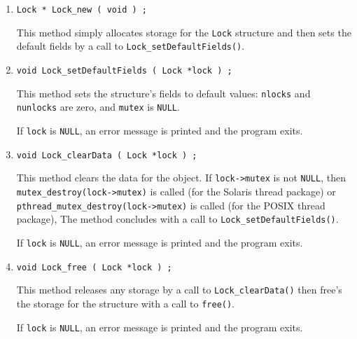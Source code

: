 \begin{enumerate}
\item
\begin{verbatim}
Lock * Lock_new ( void ) ;
\end{verbatim}
This method simply allocates storage for the {\tt Lock} structure 
and then sets the default fields by a call to 
{\tt Lock\_setDefaultFields()}.
\item
\begin{verbatim}
void Lock_setDefaultFields ( Lock *lock ) ;
\end{verbatim}
This method sets the structure's fields to default values:
{\tt nlocks} and {\tt nunlocks} are zero, and {\tt mutex} is {\tt NULL}.
\par {}
If {\tt lock} is {\tt NULL},
an error message is printed and the program exits.
\item
\begin{verbatim}
void Lock_clearData ( Lock *lock ) ;
\end{verbatim}
This method clears the data for the object.
If {\tt lock->mutex} is not {\tt NULL}, 
then {\tt mutex\_destroy(lock->mutex)} is called 
(for the Solaris thread package)
or {\tt pthread\_mutex\_destroy(lock->mutex)} is called 
(for the POSIX thread package),
The method concludes with a call to {\tt Lock\_setDefaultFields()}.
\par {}
If {\tt lock} is {\tt NULL},
an error message is printed and the program exits.
\item
\begin{verbatim}
void Lock_free ( Lock *lock ) ;
\end{verbatim}
This method releases any storage by a call to 
{\tt Lock\_clearData()} then free's the storage for the 
structure with a call to {\tt free()}.
\par {}
If {\tt lock} is {\tt NULL},
an error message is printed and the program exits.
\end{enumerate}
\par
